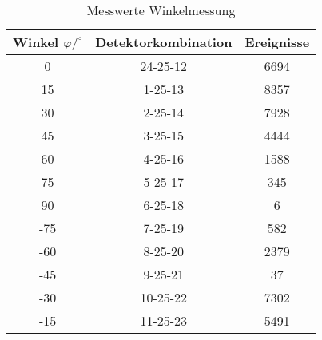 \begin{table}[h]
\centering
\small
\caption{Messwerte Winkelmessung}
\label{tab:winkel}
\begin{tabular}{ccc}
\toprule
Winkel $\varphi/^\circ$& Detektorkombination & Ereignisse\\
\midrule
0 &	24-25-12	&6694\\
15&	1-25-13	&8357\\
30&	2-25-14	&7928\\
45&	3-25-15	&4444\\
60&	4-25-16	&1588\\
75&	5-25-17	&345\\
90&	6-25-18	&6\\
-75&7-25-19	&582\\
-60&8-25-20	&2379\\
-45&9-25-21	&37\\
-30&10-25-22	&7302\\
-15&11-25-23	&5491\\
\bottomrule
\end{tabular}
\end{table}

